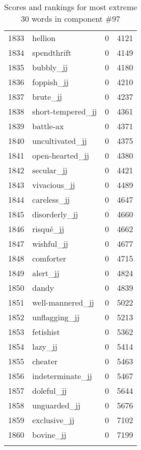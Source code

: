 \begin{longtable}[!htbp]{| rlr@{.}l |}
    1833 & hellion & 0 & 4121 \\
    1834 & spendthrift & 0 & 4149 \\
    1835 & bubbly\_jj & 0 & 4180 \\
    1836 & foppish\_jj & 0 & 4210 \\
    1837 & brute\_jj & 0 & 4237 \\
    1838 & short-tempered\_jj & 0 & 4361 \\
    1839 & battle-ax & 0 & 4371 \\
    1840 & uncultivated\_jj & 0 & 4375 \\
    1841 & open-hearted\_jj & 0 & 4380 \\
    1842 & secular\_jj & 0 & 4421 \\
    1843 & vivacious\_jj & 0 & 4489 \\
    1844 & careless\_jj & 0 & 4647 \\
    1845 & disorderly\_jj & 0 & 4660 \\
    1846 & risqué\_jj & 0 & 4662 \\
    1847 & wishful\_jj & 0 & 4677 \\
    1848 & comforter & 0 & 4715 \\
    1849 & alert\_jj & 0 & 4824 \\
    1850 & dandy & 0 & 4839 \\
    1851 & well-mannered\_jj & 0 & 5022 \\
    1852 & unflagging\_jj & 0 & 5213 \\
    1853 & fetishist & 0 & 5362 \\
    1854 & lazy\_jj & 0 & 5414 \\
    1855 & cheater & 0 & 5463 \\
    1856 & indeterminate\_jj & 0 & 5467 \\
    1857 & doleful\_jj & 0 & 5644 \\
    1858 & unguarded\_jj & 0 & 5676 \\
    1859 & exclusive\_jj & 0 & 7102 \\
    1860 & bovine\_jj & 0 & 7199 \\
    \hline
    \caption{Scores and rankings for most extreme 30 words in component \#97} \\
\end{longtable}
